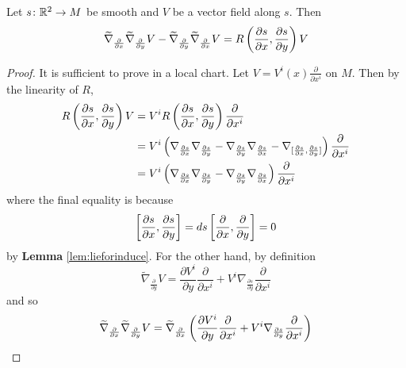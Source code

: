 \begin{enumerate}[label=\arabic{*}.]
	\begin{prop}
		Let $s \colon \mathbb{R}^2 \rightarrow M$ be smooth and $V$ be a vector field along $s$. Then
		\begin{equation*}
			\widetilde{\nabla}_{\frac{\partial}{\partial x}}\widetilde{\nabla}_{\frac{\partial}{\partial y}}V - \widetilde{\nabla}_{\frac{\partial}{\partial y}}\widetilde{\nabla}_{\frac{\partial}{\partial x}}V = R\left(\frac{\partial s}{\partial x},\frac{\partial s}{\partial y}\right)V
		\end{equation*}
	\end{prop}
	\begin{proof}
		It is sufficient to prove in a local chart. Let $V = V^i(x)\frac{\partial}{\partial x^i}$ on $M$. Then by the linearity of $R$,
		\begin{equation*}
			\begin{aligned}
				R\left(\frac{\partial s}{\partial x},\frac{\partial s}{\partial y}\right)V &=V^i R\left(\frac{\partial s}{\partial x},\frac{\partial s}{\partial y}\right)\frac{\partial}{\partial x^i} \\
				&= V^i\left(\nabla_{\frac{\partial s}{\partial x}}\nabla_{\frac{\partial s}{\partial y}} - \nabla_{\frac{\partial s}{\partial y}}\nabla_{\frac{\partial s}{\partial x}} - \nabla_{[\frac{\partial s}{\partial x},\frac{\partial s}{\partial y}]}\right)\frac{\partial}{\partial x^i} \\
				&= V^i\left(\nabla_{\frac{\partial s}{\partial x}}\nabla_{\frac{\partial s}{\partial y}} - \nabla_{\frac{\partial s}{\partial y}}\nabla_{\frac{\partial s}{\partial x}}\right)\frac{\partial}{\partial x^i}
			\end{aligned}
		\end{equation*}
		where the final equality is because
		\begin{equation*}
			\left[\frac{\partial s}{\partial x},\frac{\partial s}{\partial y}\right] = ds\left[\frac{\partial}{\partial x},\frac{\partial}{\partial y}\right] = 0 
		\end{equation*}
		by \textbf{Lemma} \ref{lem:lieforinduce}. For the other hand, by definition
		\begin{equation*}
			\widetilde{\nabla}_{\frac{\partial}{\partial y}}V = \frac{\partial V^i}{\partial y}\frac{\partial}{\partial x^i}+V^i\nabla_{\frac{\partial s}{\partial y}} \frac{\partial}{\partial x^i}
		\end{equation*}
		and so
		\begin{equation*}
			\begin{aligned}
				\widetilde{\nabla}_{\frac{\partial}{\partial x}}\widetilde{\nabla}_{\frac{\partial}{\partial y}}V &= \widetilde{\nabla}_{\frac{\partial}{\partial x}}\bc{\frac{\partial V^i}{\partial y}\frac{\partial}{\partial x^i}+V^i\nabla_{\frac{\partial s}{\partial y}} \frac{\partial}{\partial x^i}} \\

\end{aligned}
\end{equation*}
\end{proof}
\end{enumerate}
